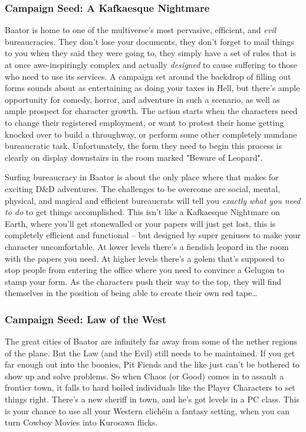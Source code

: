 \subsubsection{Campaign Seed: A Kafkaesque Nightmare}

Baator is home to one of the multiverse's most pervasive, efficient, and \textit{evil} bureaucracies. They don't lose your documents, they don't forget to mail things to you when they said they were going to, they simply have a set of rules that is at once awe-inspiringly complex and actually \textit{designed} to cause suffering to those who need to use its services. A campaign set around the backdrop of filling out forms sounds about as entertaining as doing your taxes in Hell, but there's ample opportunity for comedy, horror, and adventure in such a scenario, as well as ample prospect for character growth. The action starts when the characters need to change their registered employment, or want to protest their home getting knocked over to build a throughway, or perform some other completely mundane bureaucratic task. Unfortunately, the form they need to begin this process is clearly on display downstairs in the room marked "Beware of Leopard".

Surfing bureaucracy in Baator is about the only place where that makes for exciting D\&D adventures. The challenges to be overcome are social, mental, physical, and magical and efficient bureaucrats will tell you \textit{exactly what you need to do} to get things accomplished. This isn't like a Kafkaesque Nightmare on Earth, where you'll get stonewalled or your papers will just get lost, this is completely efficient and functional -- but designed by super geniuses to make your character uncomfortable. At lower levels there's a fiendish leopard in the room with the papers you need. At higher levels there's a golem that's supposed to stop people from entering the office where you need to convince a Gelugon to stamp your form. As the characters push their way to the top, they will find themselves in the position of being able to create their own red tape\ldots


\subsubsection{Campaign Seed: Law of the West}

The great cities of Baator are infinitely far away from some of the nether regions of the plane. But the Law (and the Evil) still needs to be maintained. If you get far enough out into the boonies, Pit Fiends and the like just can't be bothered to show up and solve problems. So when Chaos (or Good) comes in to assault a frontier town, it falls to hard boiled individuals like the Player Characters to set things right. There's a new sheriff in town, and he's got levels in a PC class. This is your chance to use all your Western clichéin a fantasy setting, when you can turn Cowboy Movies into Kurosawa flicks.

